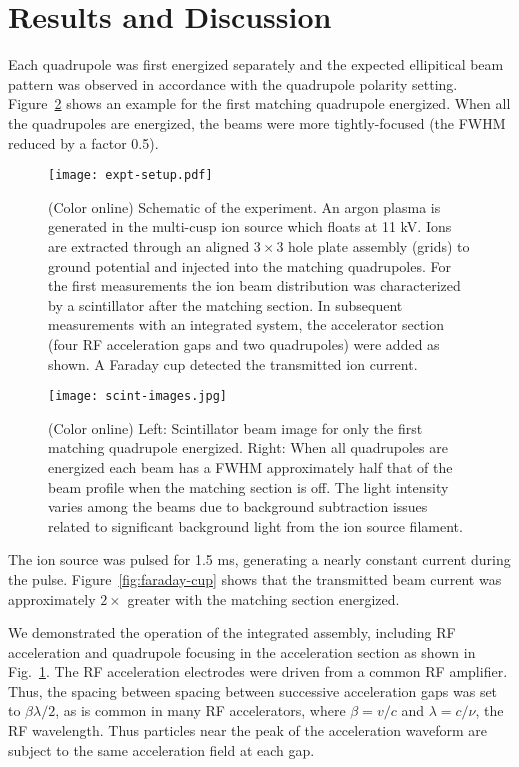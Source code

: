 \documentclass[%
 aip,
rsi,%
 amsmath,amssymb,
 reprint,%
]{revtex4-1}
\begin{document}
\section{Results and Discussion}

Each quadrupole was first energized separately and the expected ellipitical beam pattern was observed in accordance with the quadrupole polarity setting.  Figure~\ref{fig:scintillator} shows an example for the first matching quadrupole energized.  When all the quadrupoles are energized, the beams were more tightly-focused (the FWHM reduced by a factor 0.5).

\begin{figure}[ht!]
  \centering
  \texttt{[image: expt-setup.pdf]}
  \caption{(Color online) Schematic of the experiment.  An argon plasma is generated in the multi-cusp ion source which floats at 11 kV. Ions are extracted through an aligned $3 \times 3$ hole plate assembly (grids) to ground potential and injected into the matching quadrupoles. For the first measurements the ion beam distribution was characterized by a scintillator after the matching section.  In subsequent measurements with an integrated system, the accelerator section (four RF acceleration gaps and two quadrupoles) were added as shown.  A Faraday cup detected the transmitted ion current.}
  \label{fig:setup}
\end{figure}

\begin{figure}[ht!]
  \centering
  \texttt{[image: scint-images.jpg]}
  \caption{(Color online) Left: Scintillator beam image for only the first matching quadrupole energized. Right: When all quadrupoles are energized each beam has a FWHM approximately half that of the beam profile when the matching section is off. The light intensity varies among the beams due to background subtraction issues related to significant background light from the ion source filament.}
  \label{fig:scintillator}
\end{figure}

The ion source was pulsed for 1.5 ms, generating a nearly constant current during the pulse.  Figure~\ref{fig:faraday-cup} shows that the transmitted beam current was approximately $2\times$ greater with the matching section energized.

We demonstrated the operation of the integrated assembly, including RF acceleration and quadrupole focusing in the acceleration section as shown in Fig.~\ref{fig:setup}.
The RF acceleration electrodes were driven from a common RF amplifier.  Thus, the spacing between spacing between successive acceleration gaps was set to $\beta \lambda / 2$, as is common in many RF accelerators, where $\beta = v/c$ and $\lambda = c / \nu$,  the RF wavelength. Thus particles near the peak of the acceleration waveform are subject to the same acceleration field at each gap.
\end{document}
